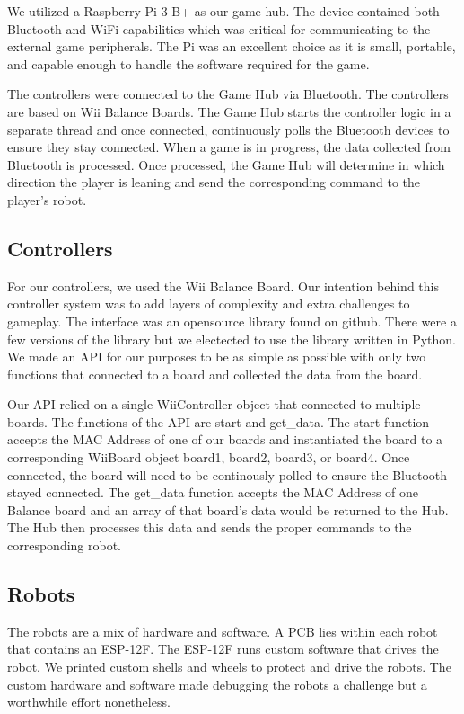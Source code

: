 \documentclass[11pt]{ieeeconf}
\begin{document}
We utilized a Raspberry Pi 3 B+ as our game hub. The device contained both Bluetooth and WiFi capabilities which was critical for communicating to the external game peripherals. The Pi was an excellent choice as it is small, portable, and capable enough to handle the software required for the game. 

The controllers were connected to the Game Hub via Bluetooth. The controllers are based on Wii Balance Boards. The Game Hub starts the controller logic in a separate thread and once connected, continuously polls the Bluetooth devices to ensure they stay connected. When a game is in progress, the data collected from Bluetooth is processed. Once processed, the Game Hub will determine in which direction the player is leaning and send the corresponding command to the player's robot.

\subsection{Controllers}
For our controllers, we used the Wii Balance Board. Our intention behind this controller system was to add layers of complexity and extra challenges to gameplay. The interface was an opensource library found on github. There were a few versions of the library but we electected to use the library written in Python. We made an API for our purposes to be as simple as possible with only two functions that connected to a board and collected the data from the board.

Our API relied on a single WiiController object that connected to multiple boards. The functions of the API are start and get\_data. The start function accepts the MAC Address of one of our boards and instantiated the board to a corresponding WiiBoard object board1, board2, board3, or board4. Once connected, the board will need to be continously polled to ensure the Bluetooth stayed connected. The get\_data function accepts the MAC Address of one Balance board and an array of that board's data would be returned to the Hub. The Hub then processes this data and sends the proper commands to the corresponding robot.

\subsection{Robots}

The robots are a mix of hardware and software. A PCB lies within each robot that contains an ESP-12F. The ESP-12F runs custom software that drives the robot. We printed custom shells and wheels to protect and drive the robots. The custom hardware and software made debugging the robots a challenge but a worthwhile effort nonetheless. 
\end{document}
